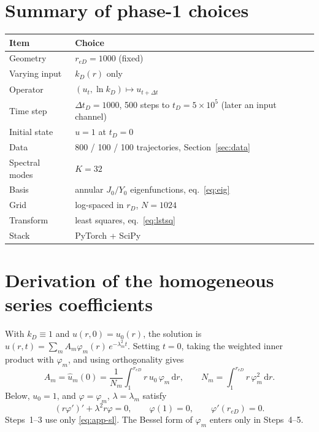 \documentclass[11pt]{article}
\newcommand{\reD}{r_{eD}}
\newcommand{\dd}{\mathrm{d}}
\begin{document}
\section{Summary of phase-1 choices}
\begin{center}
\begin{tabular}{@{}ll@{}}
\toprule
Item & Choice \\
\midrule
Geometry & $\reD=1000$ (fixed) \\
Varying input & $k_D(r)$ only \\
Operator & $(u_t,\ln k_D)\mapsto u_{t+\Delta t}$ \\
Time step & $\Delta t_D = 1000$, 500 steps to $t_D=5\times10^5$ (later an input channel) \\
Initial state & $u=1$ at $t_D=0$ \\
Data & 800 / 100 / 100 trajectories, Section~\ref{sec:data} \\
Spectral modes & $K=32$ \\
Basis & annular $J_0/Y_0$ eigenfunctions, eq.~\eqref{eq:eig} \\
Grid & log-spaced in $r_D$, $N=1024$ \\
Transform & least squares, eq.~\eqref{eq:lstsq} \\
Stack & PyTorch + SciPy \\
\bottomrule
\end{tabular}
\end{center}

\appendix
\section{Derivation of the homogeneous series coefficients}
\label{app:coef}

With $k_D\equiv1$ and $u(r,0)=u_0(r)$, the solution is $u(r,t)=\sum_m A_m\varphi_m(r)\,e^{-\lambda_m^2 t}$. Setting
$t=0$, taking the weighted inner product with $\varphi_m$, and using orthogonality gives
\begin{equation}
  A_m = \hat u_m(0) = \frac{1}{N_m}\int_1^{\reD} r\,u_0\,\varphi_m\,\dd r,
  \qquad N_m = \int_1^{\reD} r\,\varphi_m^2\,\dd r .
\end{equation}
Below, $u_0=1$, and $\varphi=\varphi_m$, $\lambda=\lambda_m$ satisfy
\begin{equation}
  (r\varphi')' + \lambda^2 r\varphi = 0,\qquad \varphi(1)=0,\qquad \varphi'(\reD)=0 .
  \label{eq:app-sl}
\end{equation}
Steps~1--3 use only \eqref{eq:app-sl}. The Bessel form of $\varphi_m$ enters only in Steps~4--5.
\end{document}
